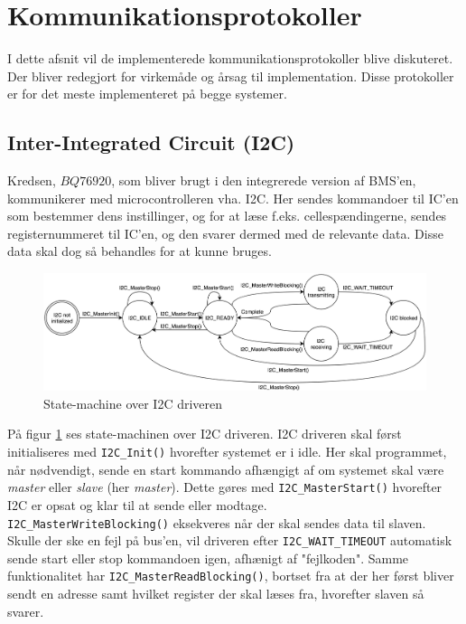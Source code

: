 \section{Kommunikationsprotokoller}

I dette afsnit vil de implementerede kommunikationsprotokoller blive diskuteret. Der bliver redegjort for virkemåde og årsag til implementation. Disse protokoller er for det meste implementeret på begge systemer. 

\subsection{Inter-Integrated Circuit (I2C)}
Kredsen, $BQ76920$, som bliver brugt i den integrerede version af BMS'en, kommunikerer med microcontrolleren vha. I2C. Her sendes kommandoer til IC'en som bestemmer dens instillinger, og for at læse f.eks. cellespændingerne, sendes registernummeret til IC'en, og den svarer dermed med de relevante data. Disse data skal dog så behandles for at kunne bruges. \\


\begin{figure}[h]
	\centering
	\includegraphics[width=15cm]{billeder/I2C_sm.png}
	\caption{State-machine over I2C driveren}
	\label{fig:I2C_sm}
\end{figure}

På figur \ref{fig:I2C_sm} ses state-machinen over I2C driveren. I2C driveren skal først initialiseres med \verb|I2C_Init()| hvorefter systemet er i idle. Her skal programmet, når nødvendigt, sende en start kommando afhængigt af om systemet skal være \textit{master} eller \textit{slave} (her \textit{master}). Dette gøres med \verb|I2C_MasterStart()| hvorefter I2C er opsat og klar til at sende eller modtage. \\

\verb|I2C_MasterWriteBlocking()| eksekveres når der skal sendes data til slaven. Skulle der ske en fejl på bus'en, vil driveren efter \verb|I2C_WAIT_TIMEOUT| automatisk sende start eller stop kommandoen igen, afhænigt af "fejlkoden". Samme funktionalitet har \verb|I2C_MasterReadBlocking()|, bortset fra at der her først bliver sendt en adresse samt hvilket register der skal læses fra, hvorefter slaven så svarer. \\


